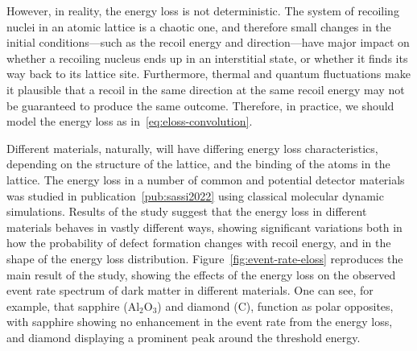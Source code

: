 \documentclass[b5paper, 10pt, twoside]{book}
\begin{document}
However, in reality, the energy loss is not deterministic. The system of recoiling nuclei in an atomic lattice is a chaotic one, and therefore small changes in the initial conditions---such as the recoil energy and direction---have major impact on whether a recoiling nucleus ends up in an interstitial state, or whether it finds its way back to its lattice site. Furthermore, thermal and quantum fluctuations make it plausible that a recoil in the same direction at the same recoil energy may not be guaranteed to produce the same outcome. Therefore, in practice, we should model the energy loss as in~\eqref{eq:eloss-convolution}.

Different materials, naturally, will have differing energy loss characteristics, depending on the structure of the lattice, and the binding of the atoms in the lattice. The energy loss in a number of common and potential detector materials was studied in publication~\ref{pub:sassi2022} using classical molecular dynamic simulations. Results of the study suggest that the energy loss in different materials behaves in vastly different ways, showing significant variations both in how the probability of defect formation changes with recoil energy, and in the shape of the energy loss distribution. Figure~\ref{fig:event-rate-eloss} reproduces the main result of the study, showing the effects of the energy loss on the observed event rate spectrum of dark matter in different materials. One can see, for example, that sapphire ($\text{Al}_2\text{O}_3$) and diamond (C), function as polar opposites, with sapphire showing no enhancement in the event rate from the energy loss, and diamond displaying a prominent peak around the threshold energy.
\end{document}
